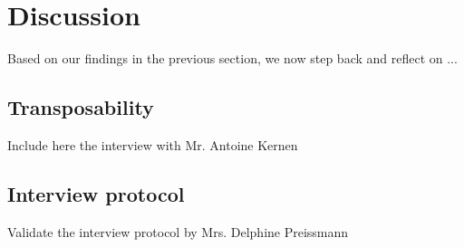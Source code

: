 \section{Discussion}
\label{discussion}

Based on our findings in the previous section, we now step back and reflect on ...

\subsection{Transposability}

Include here the interview with Mr. Antoine Kernen

\subsection{Interview protocol}

Validate the interview protocol by Mrs. Delphine Preissmann